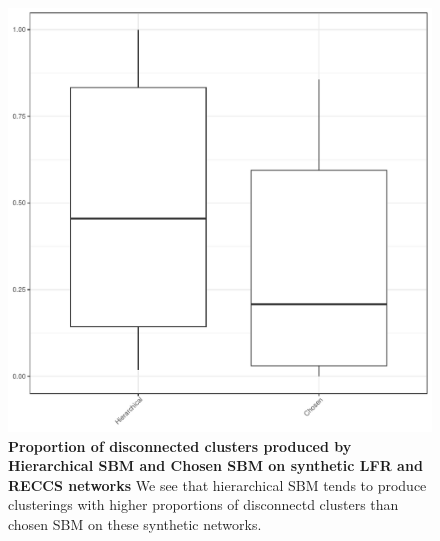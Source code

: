 \documentclass[aps,pre,superscriptaddress]{revtex4}
\begin{document}
\begin{figure}[!htpb]
\centering
\includegraphics[]{figures/conn_box.pdf}
\caption[]{\textbf{Proportion of disconnected clusters produced by Hierarchical SBM and Chosen SBM on synthetic LFR and RECCS networks}  We see that hierarchical SBM tends to produce clusterings with higher proportions of disconnectd clusters than chosen SBM on these synthetic networks.}
\label{fig:synthetic-connectivity}
\end{figure}
\end{document}
